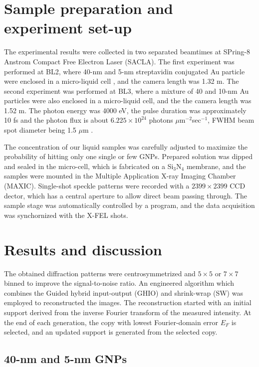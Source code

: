 \documentclass[aps,prb,reprint,groupedaddress, superscriptaddress]{revtex4-1}
\begin{document}
\section{Sample preparation and experiment set-up}

The experimental results were collected in two separated beamtimes at SPring-8 Anstrom Compact Free Electron Laser (SACLA). 
The first experiment was performed at BL2, where 40-nm and 5-nm streptavidin conjugated Au particle were enclosed in a micro-liquid cell \cite{liquid-cell}, and the camera length was 1.32 m. 
The second experiment was performed at BL3, where a mixture of 40 and 10-nm Au particles were also enclosed in a micro-liquid cell, and the the camera length was 1.52 m. 
The photon energy was 4000 eV, the pulse duration was approximately 10 fs and the photon flux is about $6.225\times 10^{24}$ photons $\mu$m$^{-2}$sec$^{-1}$, FWHM beam spot diameter being 1.5 $\mu$m \cite{xfel-ssr}.

The concentration of our liquid samples was carefully adjusted to maximize the probability of hitting only one single or few GNPs. 
Prepared solution was dipped and sealed in the micro-cell, which is fabricated on a Si$_3$N$_4$ membrane, and the samples were mounted in the Multiple Application X-ray Imaging Chamber (MAXIC). 
Single-shot speckle patterns were recorded with a $2399\times2399$ CCD dector, which has a central aperture to allow direct beam passing through. 
The sample stage was automatically controlled by a program, and the data acquisition was synchornized with the X-FEL shots.


\section{Results and discussion}

The obtained diffraction patterns were centrosymmetrized and $5\times5$ or $7\times7$ binned to improve the signal-to-noise ratio. 
An engineered algorithm which combines the Guided hybrid input-output (GHIO) \cite{ghio} and shrink-wrap (SW) \cite{sw} was employed to reconstructed the images. 
The reconstruction started with an initial support derived from the inverse Fourier transform of the measured intensity. 
At the end of each generation, the copy with lowest Fourier-domain error $E_F$ is selected, and an updated support is generated from the selected copy.


\subsection{40-nm and 5-nm GNPs}
\end{document}
